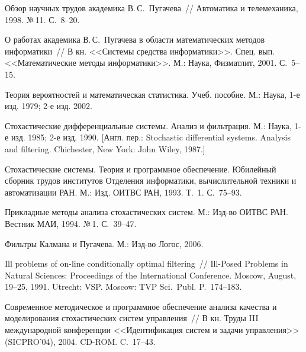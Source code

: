\begin{multicols}{2}
{\small\frenchspacing
{%
\begin{thebibliography}{99}
Обзор научных трудов академика В.\,С.~Пугачева~// Автоматика
и телемеханика, 1998. №\,11. С.~8--20.

О работах академика В.\,С.~Пугачева в области математических методов информатики~//
В кн. <<Системы средства информатики>>. Спец. вып.
<<Математические методы информатики>>. М.: Наука, Физматлит,
2001. С.~5--15.

Теория вероятностей и математическая
статистика. Учеб. пособие. М.: Наука, 1-е изд. 1979; 2-е изд. 2002.

Стохастические дифференциальные системы. Анализ и фильтрация.
М.: Наука, 1-е изд. 1985; 2-е изд. 1990.
[Англ. пер.:  Stochastic differential
systems. Analysis and  filtering.  Chichester, New York: John
Wiley, 1987.]

Стохастические сис\-те\-мы. Теория
и программное обеспечение. Юбилейный сборник трудов институтов
Отделения информатики, вычислительной техники и автоматизации РАН.
М.: Изд. ОИТВС РАН, 1993. Т.~1. С.~75--93.

 Прикладные методы анализа стохастических систем.
М.: Изд-во ОИТВС РАН. Вестник МАИ,
1994. №\,1. С.~39--47.

Фильтры Калмана и Пугачева. М.: Изд-во Логос, 2006.

Ill problems of on-line
conditionally optimal filtering~// Ill-Posed Problems in
Natural Sciences: Proceedings of the International Conference.
Moscow, August, 19--25, 1991. %
Utrecht: VSP. Moscow: TVP Sci.\ Publ. P.~174--183.

Современное методическое и программное обеспечение анализа качества и 
моделирования стохастических сис\-тем управления~// В кн. Труды III 
международной конференции <<Идентификация сис\-тем и задачи управления>> 
(SICPRO'04), 2004. CD-ROM. C.~17--43.



\end{thebibliography}}}
\end{multicols}
